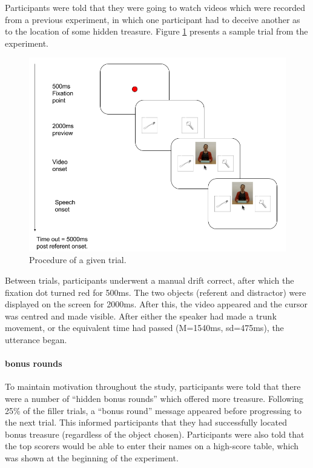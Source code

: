 \documentclass[a4paper,man,natbib]{apa6}
\begin{document}
Participants were told that they were going to watch videos which were recorded from a previous experiment, in which one participant had to deceive another as to the location of some hidden treasure. 
Figure \ref{fig:v1trial} presents a sample trial from the experiment. 
\begin{figure}[Ht]
  \centering
	\includegraphics[width=\linewidth]{gcdv1.png}
  \caption{Procedure of a given trial.}
  \label{fig:v1trial}
\end{figure}
Between trials, participants underwent a manual drift correct, after which the fixation dot turned red for 500ms. 
The two objects (referent and distractor) were displayed on the screen for 2000ms.
After this, the video appeared and the cursor was centred and made visible. 
After either the speaker had made a trunk movement, or the equivalent time had passed (M=1540ms, sd=475ms), the utterance began. 

\paragraph{bonus rounds}
To maintain motivation throughout the study, participants were told that there were a number of ``hidden bonus rounds'' which offered more treasure. 
Following 25\% of the filler trials, a ``bonus round'' message appeared before progressing to the next trial.
This informed participants that they had successfully located bonus treasure (regardless of the object chosen).
Participants were also told that the top scorers would be able to enter their names on a high-score table, which was shown at the beginning of the experiment. 
\end{document}
